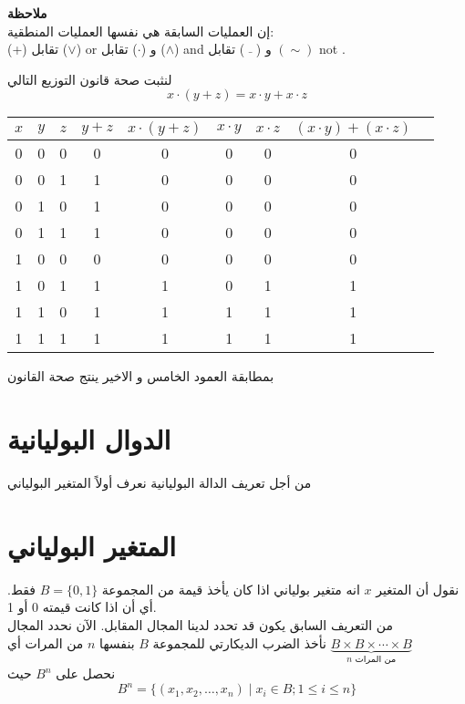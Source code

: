 \noindent
\textbf{ملاحظة}\\
\noindent
إن العمليات السابقة هي نفسها العمليات المنطقية:\\
	(+) تقابل ($\vee$) or  و ($\cdot$) تقابل ($\wedge$) and و ( $\bar{}$ ) تقابل $(\sim)$ not .
	\begin{example}
			لنثبت صحة قانون التوزيع التالي
		\[
		x\cdot (y+z) = x\cdot y + x \cdot z
		\]
		\begin{english}
			\begin{table}[H]
				\renewcommand{\arraystretch}{1.3}
				\centering
				\begin{tabular}{|c|c|c|c|c|c|c|c|c|}
					\hline
					$x$ & $y$ & $z$ & $y+z$ & $x\cdot(y+z)$ & $x\cdot y$ & $x\cdot z$ & $(x\cdot y)+(x\cdot z)$\\
					\hline
					0 & 0 & 0 & 0 & 0 & 0 & 0 & 0\\
					\hline
					0 & 0 & 1 & 1 & 0 & 0 & 0 &0\\
					\hline
					0 &1 &0&1& 0& 0& 0& 0\\
					\hline
					0 &1 &1 &1 &0 &0 &0& 0\\
					\hline
					1 &0 &0 &0 &0 &0 &0 &0\\
					\hline
					1 &0& 1& 1& 1& 0& 1& 1\\
					\hline
					1 &1 &0 &1 &1 &1 &1 &1\\
					\hline
					1& 1 &1& 1& 1& 1& 1& 1\\
					\hline 
				\end{tabular}
			\end{table}
		\end{english}
		بمطابقة العمود الخامس و الاخير ينتج صحة القانون
	\end{example}

\section{الدوال البوليانية}
من أجل تعريف الدالة البوليانية نعرف أولاً المتغير البولياني
\section*{المتغير البولياني}
نقول أن المتغير $x$ انه متغير بولياني اذا كان يأخذ قيمة من المجموعة $B=\{0,1\}$ فقط. أي أن اذا كانت قيمته 0 أو 1.\\
من  التعريف السابق يكون قد تحدد لدينا المجال المقابل. الآن نحدد المجال\\
نأخذ الضرب الديكارتي للمجموعة $B$ بنفسها $n$ من المرات أي 
$\underbrace{B\times B \times \cdots \times B}_{\text{$n$ من المرات}}$\\
نحصل على $B^n$ حيث 
\[
B^n = \{(x_1, x_2, \dots, x_n) \mid x_i \in B ; 1 \leq i\leq n\}
\]
